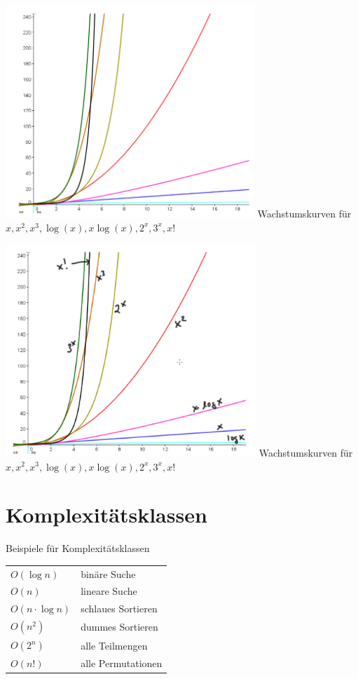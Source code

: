 \documentclass{beamer}
\begin{document}
\begin{frame}[fragile]
\includegraphics[height=8cm]{kurven.png}
Wachstumskurven für $x, x^2, x^3, \log(x), x\log(x), 2^x, 3^x, x!$
\end{frame}
\begin{frame}[fragile]
\includegraphics[height=8cm]{bild2.jpg}
Wachstumskurven für $x, x^2, x^3, \log(x), x\log(x), 2^x, 3^x, x!$
\end{frame}
\section{Komplexitätsklassen}
\begin{frame}[fragile]

Beispiele für Komplexitätsklassen  

\begin{tabular}{ll}
$O(\log n)$   &  binäre Suche  \\ 
$O(n)$   &  lineare Suche  \\ 
$O(n \cdot \log n)$   &  schlaues Sortieren  \\  
$O(n^2)$   &  dummes Sortieren  \\  
$O(2^n)$   &  alle Teilmengen \\ 
$O(n!)$   &  alle Permutationen  
\end{tabular}
\end{frame}
\end{document}
